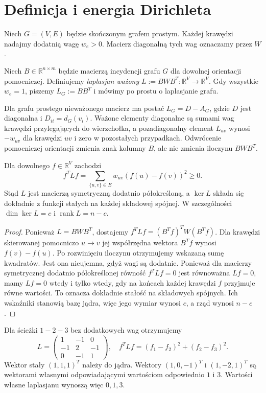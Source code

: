 \section{Definicja i energia Dirichleta}
\label{sec:tg-lap-definition}

Niech $G=(V,E)$ będzie skończonym grafem prostym.
Każdej krawędzi nadajmy dodatnią wagę $w_e>0$.
Macierz diagonalną tych wag oznaczamy przez $W$.

\begin{definicja}
Niech $B\in\mathbb R^{n\times m}$ będzie macierzą incydencji
grafu $G$ dla dowolnej orientacji pomocniczej. Definiujemy
\emph{laplasjan ważony} $L:=BWB^T:\mathbb R^V\to\mathbb R^V$.
Gdy wszystkie $w_e=1$, piszemy $L_G:=BB^T$ i mówimy
po prostu o laplasjanie grafu.
\end{definicja}

Dla grafu prostego nieważonego macierz ma postać
$L_G=D-A_G$, gdzie $D$ jest diagonalna i $D_{ii}=d_G(v_i)$.
Ważone elementy diagonalne są sumami wag krawędzi
przylegających do wierzchołka, a pozadiagonalny element
$L_{uv}$ wynosi $-w_{uv}$ dla krawędzi $uv$ i zero w pozostałych
przypadkach. Odwrócenie pomocniczej orientacji zmienia znak
kolumny $B$, ale nie zmienia iloczynu $BWB^T$.

\begin{twierdzenie}
\label{thm:tg-energy}
Dla dowolnego $f\in\mathbb R^V$ zachodzi
\[
f^TLf=\sum_{\{u,v\}\in E}w_{uv}(f(u)-f(v))^2\ge0.
\]
Stąd $L$ jest macierzą symetryczną dodatnio półokreśloną, a
$\ker L$ składa się dokładnie z funkcji stałych na każdej
składowej spójnej. W szczególności $\dim\ker L=c$ i
$\operatorname{rank}L=n-c$.
\end{twierdzenie}

\begin{proof}
Ponieważ $L=BWB^T$, dostajemy
$f^TLf=(B^Tf)^TW(B^Tf)$. Dla krawędzi skierowanej
pomocniczo $u\to v$ jej współrzędna wektora $B^Tf$
wynosi $f(v)-f(u)$. Po rozwinięciu iloczynu otrzymujemy
wskazaną sumę kwadratów. Jest ona nieujemna, gdyż wagi są
dodatnie. Ponieważ dla macierzy symetrycznej dodatnio
półokreślonej równość $f^TLf=0$ jest równoważna
$Lf=0$, mamy $Lf=0$ wtedy i tylko wtedy, gdy na
końcach każdej krawędzi $f$ przyjmuje równe wartości.
To oznacza dokładnie stałość na składowych spójnych.
Ich wskaźniki stanowią bazę jądra, więc jego wymiar wynosi
$c$, a rząd wynosi $n-c$.
\end{proof}

\begin{przyklad}
Dla ścieżki $1-2-3$ bez dodatkowych wag otrzymujemy
\[
L=\begin{pmatrix}1&-1&0\\-1&2&-1\\0&-1&1\end{pmatrix},
\quad
f^TLf=(f_1-f_2)^2+(f_2-f_3)^2.
\]
Wektor stały $(1,1,1)^T$ należy do jądra.
Wektory $(1,0,-1)^T$ i $(1,-2,1)^T$ są wektorami własnymi
odpowiadającymi wartościom odpowiednio $1$ i $3$.
Wartości własne laplasjanu wynoszą więc $0,1,3$.
\end{przyklad}

